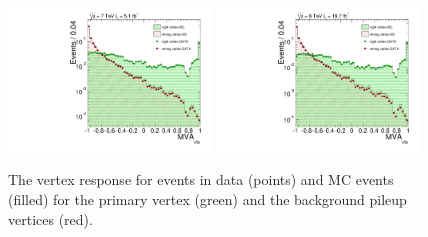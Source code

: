 \begin{figure}
  \includegraphics[width=0.48\textwidth]{analysis_comps/plots/vertex_bdt_output_7TeV_log.pdf}
  \includegraphics[width=0.48\textwidth]{analysis_comps/plots/vertex_bdt_output_8TeV_log.pdf}
  \caption[The vertex \acs{BDT} response for \Zmumu events]{The vertex \BDT response for \Zmumu events in data (points) and MC events (filled) for the primary vertex (green) and the background pileup vertices (red).}
  \label{fig:vertex_bdt_response}
\end{figure}


